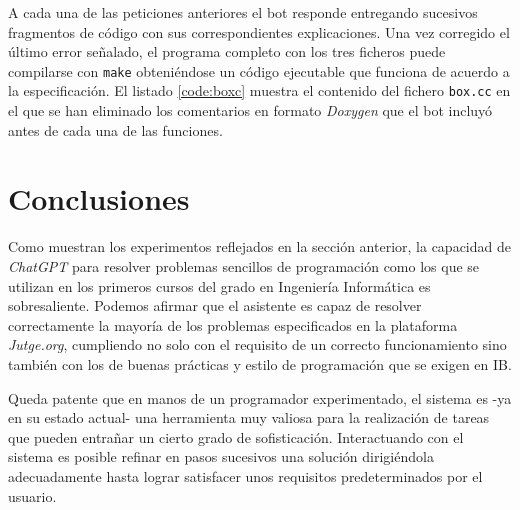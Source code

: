 \documentclass[twocolumn,twoside,a4paper, 10pt]{article}
\newcommand{\jutge}{\textit{Jutge.org}{}}           %
\newcommand{\ChatGPT}{\textit{ChatGPT}{}}           %
\begin{document}
%
A cada una de las peticiones anteriores el bot responde entregando sucesivos fragmentos de código con sus correspondientes 
explicaciones.
Una vez corregido el último error señalado, el programa completo con los tres ficheros puede compilarse con
\texttt{make} obteniéndose un código ejecutable que funciona de acuerdo a la especificación.
El listado \ref{code:boxc} muestra el contenido del fichero \texttt{box.cc} en el que se han eliminado los comentarios
en formato \textit{Doxygen} que el bot incluyó antes de cada una de las funciones.

\section{Conclusiones}
Como muestran los experimentos reflejados en la sección anterior, la capacidad de \ChatGPT{} para resolver problemas sencillos
de programación como los que se utilizan en los primeros cursos del grado en Ingeniería Informática es
sobresaliente.
Podemos afirmar que el asistente es capaz de resolver correctamente la mayoría de los problemas especificados en
la plataforma \jutge{}, cumpliendo no solo con el requisito de un correcto funcionamiento sino también con los
de buenas prácticas y estilo de programación que se exigen en IB.

Queda patente que en manos de un programador experimentado, el sistema es -ya en su estado actual- una
herramienta muy valiosa para la realización de tareas que pueden entrañar un cierto grado de sofisticación.
Interactuando con el sistema es posible refinar en pasos sucesivos una solución dirigiéndola adecuadamente
hasta lograr satisfacer unos requisitos predeterminados por el usuario.
\end{document}

